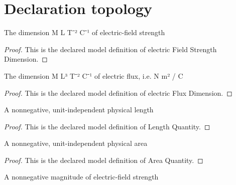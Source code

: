 \section{Declaration topology}
\begin{definition}
  \label{def:physics:phyx-mini-0846:phyxminiproblems-problemphyxmini0846-electricfieldstrengthdimension}
  The dimension M L T⁻² C⁻¹ of electric-field strength
\end{definition}
\begin{proof}
  This is the declared model definition of electric Field Strength Dimension.
\end{proof}
\begin{definition}
  \label{def:physics:phyx-mini-0846:phyxminiproblems-problemphyxmini0846-electricfluxdimension}
  The dimension M L³ T⁻² C⁻¹ of electric flux, i.e. N m² / C
\end{definition}
\begin{proof}
  This is the declared model definition of electric Flux Dimension.
\end{proof}
\begin{definition}
  \label{def:physics:phyx-mini-0846:phyxminiproblems-problemphyxmini0846-lengthquantity}
  A nonnegative, unit-independent physical length
\end{definition}
\begin{proof}
  This is the declared model definition of Length Quantity.
\end{proof}
\begin{definition}
  \label{def:physics:phyx-mini-0846:phyxminiproblems-problemphyxmini0846-areaquantity}
  A nonnegative, unit-independent physical area
\end{definition}
\begin{proof}
  This is the declared model definition of Area Quantity.
\end{proof}
\begin{definition}
  \label{def:physics:phyx-mini-0846:phyxminiproblems-problemphyxmini0846-electricfieldstrengthquantity}
  A nonnegative magnitude of electric-field strength
\end{definition}
